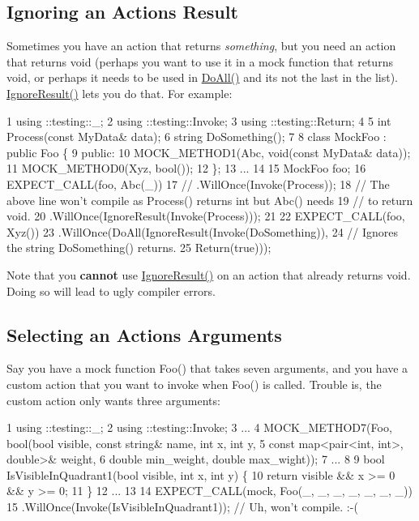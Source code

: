 \subsection*{Ignoring an Action\textquotesingle{}s Result}

Sometimes you have an action that returns {\itshape something}, but you need an action that returns {\ttfamily void} (perhaps you want to use it in a mock function that returns {\ttfamily void}, or perhaps it needs to be used in {\ttfamily \hyperlink{namespacetesting_a5f533932753d2af95000e96c4a3042e3}{Do\+All()}} and it\textquotesingle{}s not the last in the list). {\ttfamily \hyperlink{namespacetesting_a50ae42540a31047c7fddd32df8d835f5}{Ignore\+Result()}} lets you do that. For example\+:


\begin{DoxyCode}
1 using ::testing::\_;
2 using ::testing::Invoke;
3 using ::testing::Return;
4 
5 int Process(const MyData& data);
6 string DoSomething();
7 
8 class MockFoo : public Foo \{
9  public:
10   MOCK\_METHOD1(Abc, void(const MyData& data));
11   MOCK\_METHOD0(Xyz, bool());
12 \};
13 ...
14 
15   MockFoo foo;
16   EXPECT\_CALL(foo, Abc(\_))
17   // .WillOnce(Invoke(Process));
18   // The above line won't compile as Process() returns int but Abc() needs
19   // to return void.
20       .WillOnce(IgnoreResult(Invoke(Process)));
21 
22   EXPECT\_CALL(foo, Xyz())
23       .WillOnce(DoAll(IgnoreResult(Invoke(DoSomething)),
24       // Ignores the string DoSomething() returns.
25                       Return(true)));
\end{DoxyCode}


Note that you {\bfseries cannot} use {\ttfamily \hyperlink{namespacetesting_a50ae42540a31047c7fddd32df8d835f5}{Ignore\+Result()}} on an action that already returns {\ttfamily void}. Doing so will lead to ugly compiler errors.

\subsection*{Selecting an Action\textquotesingle{}s Arguments}

Say you have a mock function {\ttfamily Foo()} that takes seven arguments, and you have a custom action that you want to invoke when {\ttfamily Foo()} is called. Trouble is, the custom action only wants three arguments\+:


\begin{DoxyCode}
1 using ::testing::\_;
2 using ::testing::Invoke;
3 ...
4   MOCK\_METHOD7(Foo, bool(bool visible, const string& name, int x, int y,
5                          const map<pair<int, int>, double>& weight,
6                          double min\_weight, double max\_wight));
7 ...
8 
9 bool IsVisibleInQuadrant1(bool visible, int x, int y) \{
10   return visible && x >= 0 && y >= 0;
11 \}
12 ...
13 
14   EXPECT\_CALL(mock, Foo(\_, \_, \_, \_, \_, \_, \_))
15       .WillOnce(Invoke(IsVisibleInQuadrant1));  // Uh, won't compile. :-(
\end{DoxyCode}


